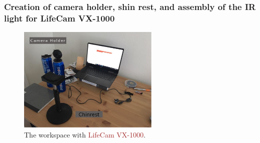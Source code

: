 \documentclass{beamer}
\begin{document}
    \begin{frame}
        \frametitle{Creation of camera holder, shin rest, and assembly of the
        IR light for LifeCam VX-1000}

        \begin{figure}
            \begin{center}
                \includegraphics[width=0.6\textwidth]{Work_space_VX_1000.jpg}
            \end{center}
            \caption{The workspace with \textcolor{brown}{LifeCam VX-1000}.}
            \label{fig:Workspace_VX}
        \end{figure}

    \end{frame}
\end{document}
